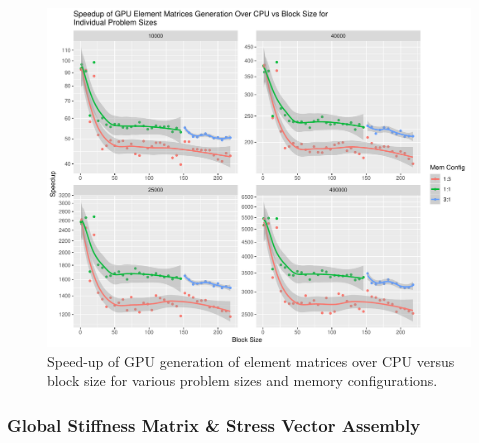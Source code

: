 \begin{figure}
	\centering
	\includegraphics[width=0.9\linewidth]{Plots/elem_mats_dev_speedups_reconfig}
	\caption{Speed-up of GPU generation of element matrices over CPU versus block size for various problem sizes and memory configurations.}
	\label{fig:elems_reconfig}
\end{figure}

\subsubsection{Global Stiffness Matrix \& Stress Vector Assembly}

